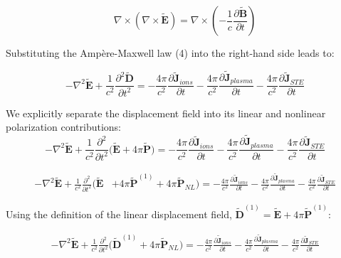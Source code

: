 \documentclass[11pt,a4paper]{article}
\begin{document}
\begin{equation*}
\nabla \times (\nabla \times \tilde{\mathbf{E}}) = \nabla \times \left( -\frac{1}{c} \frac{\partial \tilde{\mathbf{B}}}{\partial t} \right)
\end{equation*}

Substituting the Ampère-Maxwell law (4) into the right-hand side leads to: 

\begin{equation*}
-\nabla^2 \tilde{\mathbf{E}} + \frac{1}{c^2} \frac{\partial^2 \tilde{\mathbf{D}}}{\partial t^2} = -\frac{4\pi}{c^2} \frac{\partial \tilde{\mathbf{J}}_{ions}}{\partial t}-\frac{4\pi}{c^2} \frac{\partial \tilde{\mathbf{J}}_{plasma}}{\partial t}-\frac{4\pi}{c^2} \frac{\partial \tilde{\mathbf{J}}_{STE}}{\partial t}
\end{equation*}

We explicitly separate the displacement field into its linear and nonlinear polarization contributions:
\begin{equation*}
-\nabla^2 \tilde{\mathbf{E}} + \frac{1}{c^2} \frac{\partial^2}{\partial t^2}\big(\tilde{\mathbf{E}}+4\pi\tilde{\mathbf{P}}\big) = -\frac{4\pi}{c^2} \frac{\partial \tilde{\mathbf{J}}_{ions}}{\partial t}-\frac{4\pi}{c^2} \frac{\partial \tilde{\mathbf{J}}_{plasma}}{\partial t}-\frac{4\pi}{c^2} \frac{\partial \tilde{\mathbf{J}}_{STE}}{\partial t}
\end{equation*}

\begin{equation*}
\begin{split}
-\nabla^2 \tilde{\mathbf{E}} + \frac{1}{c^2} \frac{\partial^2}{\partial t^2} \bigg(\tilde{\mathbf{E}} &+ 4\pi\tilde{\mathbf{P}}^{(1)}+4\pi\tilde{\mathbf{P}}_{NL}\bigg) = -\frac{4\pi}{c^2} \frac{\partial \tilde{\mathbf{J}}_{ions}}{\partial t}-\frac{4\pi}{c^2} \frac{\partial \tilde{\mathbf{J}}_{plasma}}{\partial t}-\frac{4\pi}{c^2} \frac{\partial \tilde{\mathbf{J}}_{STE}}{\partial t}
\end{split}
\end{equation*}

Using the definition of the linear displacement field, $\tilde{\mathbf{D}}^{(1)} = \tilde{\mathbf{E}} + 4\pi \tilde{\mathbf{P}}^{(1)}$: 

\begin{equation*}
\begin{split}
-\nabla^2 \tilde{\mathbf{E}} + \frac{1}{c^2} \frac{\partial^2}{\partial t^2} \bigg(\tilde{\mathbf{D}}^{(1)} + 4\pi\tilde{\mathbf{P}}_{NL}\bigg)
= -\frac{4\pi}{c^2} \frac{\partial \tilde{\mathbf{J}}_{ions}}{\partial t}-\frac{4\pi}{c^2} \frac{\partial \tilde{\mathbf{J}}_{plasma}}{\partial t}-\frac{4\pi}{c^2} \frac{\partial \tilde{\mathbf{J}}_{STE}}{\partial t}
\end{split}
\end{equation*}
\end{document}
